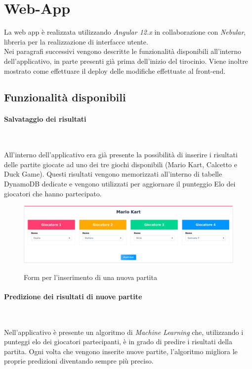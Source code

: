 \section{Web-App}
La web app è realizzata utilizzando \emph{Angular 12.x} in collaborazione con \emph{Nebular}, libreria per la realizzazione di interfacce utente. \\
Nei paragrafi successivi vengono descritte le funzionalità disponibili all'interno dell'applicativo, in parte presenti già prima dell'inizio del tirocinio. Viene inoltre mostrato come effettuare il \gls{deploy} delle modifiche effettuate al front-end.
	\subsection{Funzionalità disponibili}
		\paragraph{Salvataggio dei risultati} ~\smallskip 
		
		\noindent All'interno dell'applicativo era già presente la possibilità di inserire i risultati delle partite giocate ad uno dei tre giochi disponibili (Mario Kart, Calcetto e Duck Game). 
		Questi risultati vengono memorizzati all'interno di tabelle DynamoDB dedicate e vengono utilizzati per
		aggiornare il punteggio Elo dei giocatori che hanno partecipato.
		
		\begin{figure}[H]
			\centering
			\includegraphics[width=\textwidth]{immagini/insPartita.png} \\
			\caption{\label{fig:inserimento} Form per l'inserimento di una nuova partita}
		\end{figure}
		
		\paragraph{Predizione dei risultati di nuove partite} ~\smallskip 
		
		\noindent Nell'applicativo è presente un algoritmo di \emph{Machine Learning} che, utilizzando i punteggi elo dei giocatori partecipanti, è in grado di predire i risultati della partita.
		Ogni volta che vengono inserite nuove partite, l'algoritmo migliora le proprie predizioni diventando sempre più preciso. 
		
